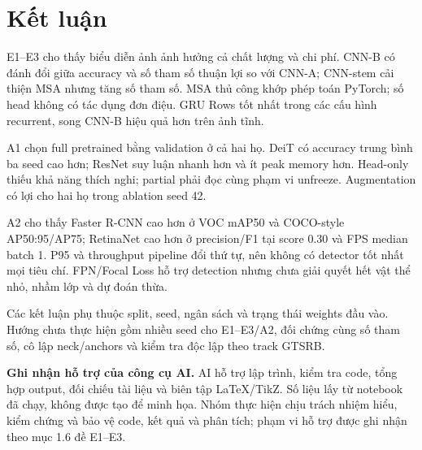 \documentclass[12pt,a4paper,oneside]{report}
\begin{document}





\chapter{Kết luận}
E1--E3 cho thấy biểu diễn ảnh ảnh hưởng cả chất lượng và chi phí.
CNN-B có đánh đổi giữa accuracy và số tham số thuận lợi so với CNN-A; CNN-stem
cải thiện MSA nhưng tăng số tham số. MSA thủ công khớp phép toán PyTorch;
số head không có tác dụng đơn điệu. GRU Rows tốt nhất trong các cấu hình
recurrent, song CNN-B hiệu quả hơn trên ảnh tĩnh.

A1 chọn full pretrained bằng validation ở cả hai họ. DeiT có accuracy
trung bình ba seed cao hơn; ResNet suy luận nhanh hơn và ít peak memory hơn.
Head-only thiếu khả năng thích nghi; partial phải đọc cùng phạm vi unfreeze.
Augmentation có lợi cho hai họ trong ablation seed 42.

A2 cho thấy Faster R-CNN cao hơn ở VOC mAP50 và COCO-style AP50:95/AP75;
RetinaNet cao hơn ở precision/F1 tại score 0.30 và FPS median batch 1.
P95 và throughput pipeline đổi thứ tự, nên không có detector tốt nhất mọi
tiêu chí. FPN/Focal Loss hỗ trợ detection nhưng chưa giải quyết hết vật thể
nhỏ, nhầm lớp và dự đoán thừa.

Các kết luận phụ thuộc split, seed, ngân sách và trạng thái weights đầu vào.
Hướng chưa thực hiện gồm nhiều seed cho E1--E3/A2, đối chứng cùng số tham số,
cô lập neck/anchors và kiểm tra độc lập theo track GTSRB.

\noindent\textbf{Ghi nhận hỗ trợ của công cụ AI.}
AI hỗ trợ lập trình, kiểm tra code, tổng hợp output, đối chiếu tài liệu và
biên tập LaTeX/TikZ. Số liệu lấy từ notebook đã chạy, không được tạo để minh họa.
Nhóm thực hiện chịu trách nhiệm hiểu, kiểm chứng và bảo vệ code, kết quả và phân tích;
phạm vi hỗ trợ được ghi nhận theo mục 1.6 đề E1--E3.

\appendix

\end{document}
